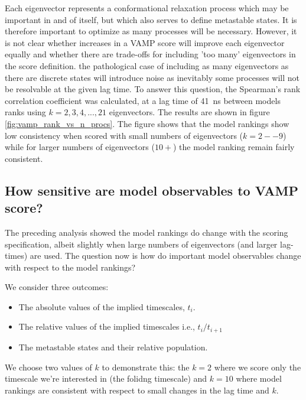 \documentclass[journal=jacsat,manuscript=article]{achemso}
\begin{document}
Each eigenvector represents a conformational relaxation process which may be important in and of itself, but which also serves to define metastable states. It is therefore important to optimize as many processes will be necessary. However, it is not clear whether increases in a VAMP score will improve each eigenvector equally and whether there are trade-offs for including 'too many' eigenvectors in the score definition. the pathological case of including as many eigenvectors as there are discrete states will introduce noise as inevitably some processes will not be resolvable at the given lag time.  To answer this question, the Spearman's rank correlation coefficient was calculated, at a lag time of \SI{41}{\nano\second}  between models ranks using $k=2, 3, 4, ..., 21$ eigenvectors.  The results are shown in figure \ref{fig:vamp_rank_vs_n_procs}. The figure shows that the model rankings show low consistency when scored with small numbers of eigenvectors ($k=2 -- 9$) while for larger numbers of eigenvectors ($10+$) the model ranking remain fairly consistent. 

\subsection{How sensitive are model observables to VAMP score?}

The preceding analysis showed the model rankings do change with the scoring specification, albeit slightly when large numbers of eigenvectors (and larger lag-times) are used.  The question now is how do important model observables change with respect to the model rankings?

We consider three outcomes: 
\begin{itemize}
    \item The absolute values of the implied timescales, $t_{i}$. 
    \item The relative values of the implied timescales i.e., $t_i/t_{i+1}$
    \item The metastable states and their relative population. 
\end{itemize}

We choose two values of $k$ to demonstrate this: the  $k=2$ where we score only the timescale we're interested in (the folidng timescale) and $k=10$ where model rankings are consistent with respect to small changes in the lag time and $k$.  
\end{document}
